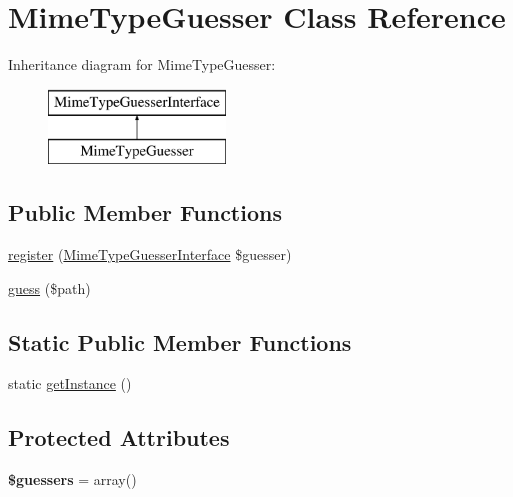 \hypertarget{class_symfony_1_1_component_1_1_http_foundation_1_1_file_1_1_mime_type_1_1_mime_type_guesser}{
\section{\-Mime\-Type\-Guesser \-Class \-Reference}
\label{class_symfony_1_1_component_1_1_http_foundation_1_1_file_1_1_mime_type_1_1_mime_type_guesser}
}
\-Inheritance diagram for \-Mime\-Type\-Guesser\-:\begin{figure}[H]
\begin{center}
\leavevmode
\includegraphics[height=2.000000cm]{class_symfony_1_1_component_1_1_http_foundation_1_1_file_1_1_mime_type_1_1_mime_type_guesser}
\end{center}
\end{figure}
\subsection*{\-Public \-Member \-Functions}
\begin{DoxyCompactItemize}
\item 
\hyperlink{class_symfony_1_1_component_1_1_http_foundation_1_1_file_1_1_mime_type_1_1_mime_type_guesser_a34206b433ddc68d44dcc6f8a6b1c76c0}{register} (\hyperlink{interface_symfony_1_1_component_1_1_http_foundation_1_1_file_1_1_mime_type_1_1_mime_type_guesser_interface}{\-Mime\-Type\-Guesser\-Interface} \$guesser)
\item 
\hyperlink{class_symfony_1_1_component_1_1_http_foundation_1_1_file_1_1_mime_type_1_1_mime_type_guesser_af42fcbb87eebfa7fa5e31c9c42af0c1a}{guess} (\$path)
\end{DoxyCompactItemize}
\subsection*{\-Static \-Public \-Member \-Functions}
\begin{DoxyCompactItemize}
\item 
static \hyperlink{class_symfony_1_1_component_1_1_http_foundation_1_1_file_1_1_mime_type_1_1_mime_type_guesser_ac93fbec81f07e5d15f80db907e63dc10}{get\-Instance} ()
\end{DoxyCompactItemize}
\subsection*{\-Protected \-Attributes}
\begin{DoxyCompactItemize}
\item 
\hypertarget{class_symfony_1_1_component_1_1_http_foundation_1_1_file_1_1_mime_type_1_1_mime_type_guesser_a9b31fadd9aa0e3b6f7235c20fef02f88}{
{\bfseries \$guessers} = array()}
\label{class_symfony_1_1_component_1_1_http_foundation_1_1_file_1_1_mime_type_1_1_mime_type_guesser_a9b31fadd9aa0e3b6f7235c20fef02f88}

\end{DoxyCompactItemize}


